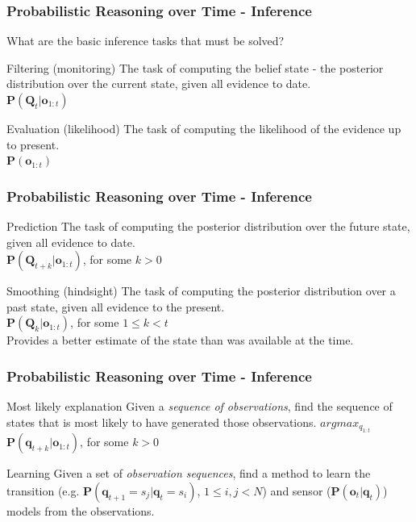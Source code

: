 \begin{frame}
  \frametitle{Probabilistic Reasoning over Time - Inference}
	What are the basic inference tasks that must be solved?
	\pause	
	
	\begin{block}{Filtering (monitoring)}
		The task of computing the \alert{belief state} - the posterior distribution over the 
		\alert{current state}, given all evidence to date.\\
		$\mathbf{P}(\mathbf{Q}_t \vert \mathbf{o}_{1:t})$
	\end{block}
	\pause
	
	\begin{block}{Evaluation (likelihood)}
		The task of computing the \alert{likelihood} of the evidence up to present.\\
		$\mathbf{P}(\mathbf{o}_{1:t})$
	\end{block}  
\end{frame}

\begin{frame}
  \frametitle{Probabilistic Reasoning over Time - Inference}
	\begin{block}{Prediction}
		The task of computing the posterior distribution over the \alert{future state}, 
		given all evidence to date.\\
		$\mathbf{P}(\mathbf{Q}_{t+k} \vert \mathbf{o}_{1:t})$, for some $k > 0$
	\end{block}
	\pause
	
	\begin{block}{Smoothing (hindsight)}
		The task of computing the posterior distribution over a \alert{past state}, 
		given all evidence to the present.\\
		$\mathbf{P}(\mathbf{Q}_k \vert \mathbf{o}_{1:t})$, for some $1 \le k < t$\\
		Provides a better estimate of the state than was available at the time.
	\end{block}
\end{frame}

\begin{frame}
  \frametitle{Probabilistic Reasoning over Time - Inference}
	\begin{block}{Most likely explanation}
		Given a \emph{sequence of observations}, find the \alert{sequence of states} that is 
		\alert{most likely} to have generated those observations.
		$argmax_{q_{1:t}}$ $\mathbf{P}(\mathbf{q}_{t+k} \vert \mathbf{o}_{1:t})$, for some $k > 0$
	\end{block}
	\pause
	
	\begin{block}{Learning}
		Given a set of \emph{observation sequences}, find a method to learn the \alert{transition} 
		(e.g. $\mathbf{P}(\mathbf{q}_{t+1} = s_j \vert \mathbf{q}_t = s_i)$, $1 \le i,j < N$) and \alert{sensor} ($\mathbf{P}(\mathbf{o}_t \vert \mathbf{q}_t)$) 
		\alert{models} from the observations.
	\end{block}
\end{frame}

